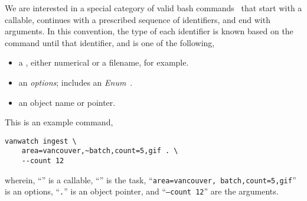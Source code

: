 We are interested in a special category of valid bash commands~\cite{shell_syntax} that start with a callable, continues with a prescribed sequence of identifiers, and end with arguments. In this convention, the type of each identifier is known based on the command until that identifier, and is one of the following,
%
\begin{itemize}
    \item a , either numerical or a filename, for example.
    \item an \emph{options}; includes an \emph{Enum}~\cite{python_eunum}.
    \item an object name or pointer.
\end{itemize}
%
This is an example command,
%
\begin{verbatim}
vanwatch ingest \
    area=vancouver,~batch,count=5,gif . \
    --count 12
\end{verbatim}
%
wherein, ``'' is a callable, ``'' is the task, ``\texttt{area=vancouver,~batch,count=5,gif}'' is an options, ``\texttt{.}'' is an object pointer, and ``\texttt{--count 12}'' are the arguments.